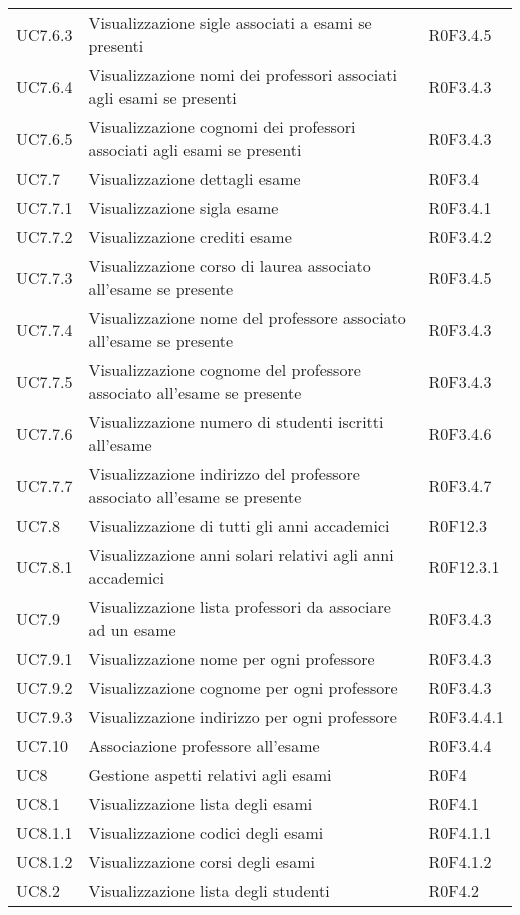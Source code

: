 \documentclass[AnalisiDeiRequisiti.tex]{subfiles}
\begin{document}
\begin{longtable}[H]{p{2cm}p{5cm}p{5cm}}
	UC7.6.3 & Visualizzazione sigle \citGloss{corsi di laurea} associati a esami se presenti & R0F3.4.5 \\
	UC7.6.4 & Visualizzazione nomi dei professori associati agli esami se presenti & R0F3.4.3 \\
	UC7.6.5 & Visualizzazione cognomi dei professori associati agli esami se presenti & R0F3.4.3 \\
	UC7.7 & Visualizzazione dettagli esame & R0F3.4 \\
	UC7.7.1 & Visualizzazione sigla esame & R0F3.4.1 \\
	UC7.7.2 & Visualizzazione crediti esame & R0F3.4.2 \\
	UC7.7.3 & Visualizzazione corso di laurea associato all'esame se presente & R0F3.4.5 \\
	UC7.7.4 & Visualizzazione nome del professore associato all'esame se presente & R0F3.4.3 \\
	UC7.7.5 & Visualizzazione cognome del professore associato all'esame se presente & R0F3.4.3 \\
	UC7.7.6 & Visualizzazione numero di studenti iscritti all'esame & R0F3.4.6 \\
	UC7.7.7 & Visualizzazione indirizzo del professore associato all'esame se presente & R0F3.4.7 \\
	UC7.8 & Visualizzazione di tutti gli anni accademici & R0F12.3 \\
	UC7.8.1 & Visualizzazione anni solari relativi agli anni accademici & R0F12.3.1 \\
	UC7.9 & Visualizzazione lista professori da associare ad un esame & R0F3.4.3 \\
	UC7.9.1 & Visualizzazione nome per ogni professore & R0F3.4.3 \\
	UC7.9.2 & Visualizzazione cognome per ogni professore & R0F3.4.3 \\
	UC7.9.3 & Visualizzazione indirizzo per ogni professore & R0F3.4.4.1 \\
	UC7.10 & Associazione professore all'esame & R0F3.4.4 \\
	UC8 & Gestione aspetti relativi agli esami & R0F4 \\
	UC8.1 & Visualizzazione lista degli esami & R0F4.1 \\
	UC8.1.1 & Visualizzazione codici degli esami & R0F4.1.1 \\
	UC8.1.2 & Visualizzazione corsi degli esami & R0F4.1.2 \\
	UC8.2 & Visualizzazione lista degli studenti & R0F4.2  \\

\end{longtable}
\end{document}
